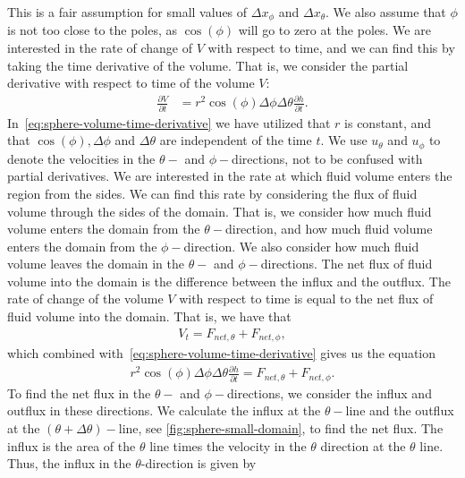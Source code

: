 This is a fair assumption for small values of $\Delta x_{\phi}$ and $\Delta x_{\theta}$.
We also assume that $\phi$ is not too close to the poles, as $\cos(\phi)$ will go to zero at the poles.
We are interested in the rate of change of $V$ with respect to time, and we can find this by taking the time derivative of the volume.
That is, we consider the partial derivative with respect to time of the volume $V$:
\begin{align}\label{eq:sphere-volume-time-derivative}
    \frac{\partial V}{\partial t} &= r^2 \cos(\phi) \Delta \phi \Delta \theta \frac{\partial h}{\partial t}.
\end{align}
In~\eqref{eq:sphere-volume-time-derivative} we have utilized that $r$ is constant, and that $\cos(\phi), \Delta \phi$ and $\Delta \theta$ are independent of the time $t$.
We use $u_{\theta}$ and $u_{\phi}$ to denote the velocities in the $\theta-$ and $\phi-$directions, not to be confused with partial derivatives.
We are interested in the rate at which fluid volume enters the region from the sides.
We can find this rate by considering the flux of fluid volume through the sides of the domain.
That is, we consider how much fluid volume enters the domain from the $\theta-$direction, and how much fluid volume enters the domain from the $\phi-$direction.
We also consider how much fluid volume leaves the domain in the $\theta-$ and $\phi-$directions.
The net flux of fluid volume into the domain is the difference between the influx and the outflux.
The rate of change of the volume $V$ with respect to time is equal to the net flux of fluid volume into the domain.
That is, we have that
\begin{align}\label{eq:V_t-F_net}
    V_t = F_{net, \theta} + F_{net, \phi},
\end{align}
which combined with~\eqref{eq:sphere-volume-time-derivative} gives us the equation
\begin{align}\label{eq:sphere-volume-time-combined}
    r^2 \cos(\phi) \Delta \phi \Delta \theta \frac{\partial h}{\partial t} = F_{net, \theta} + F_{net, \phi}.
\end{align}
To find the net flux in the $\theta-$ and $\phi-$directions, we consider the influx and outflux in these directions.
We calculate the influx at the $\theta-$line and the outflux at the $(\theta + \Delta \theta)-$line, see \autoref{fig:sphere-small-domain}, to find the net flux.
The influx is the area of the $\theta$ line times the velocity in the $\theta$ direction at the $\theta$ line.
Thus, the influx in the $\theta$-direction is given by
